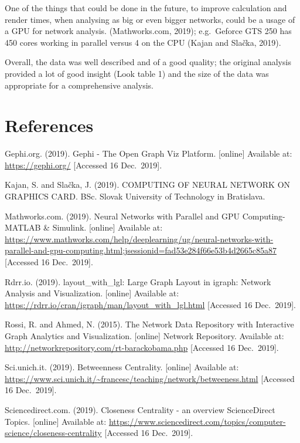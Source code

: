 \documentclass[
]{article}
\begin{document}
One of the things that could be done in the future, to improve
calculation and render times, when analysing as big or even bigger
networks, could be a usage of a GPU for network analysis.
(Mathworks.com, 2019); e.g.~Geforce GTS 250 has 450 cores working in
parallel versus 4 on the CPU (Kajan and Slačka, 2019).

Overall, the data was well described and of a good quality; the original
analysis provided a lot of good insight (Look table 1) and the size of
the data was appropriate for a comprehensive analysis.

\pagebreak

\hypertarget{references}{%
\section{References}\label{references}}

Gephi.org. (2019). Gephi - The Open Graph Viz Platform. {[}online{]}
Available at: \url{https://gephi.org/} {[}Accessed 16 Dec.~2019{]}.

Kajan, S. and Slačka, J. (2019). COMPUTING OF NEURAL NETWORK ON GRAPHICS
CARD. BSc. Slovak University of Technology in Bratislava.

Mathworks.com. (2019). Neural Networks with Parallel and GPU Computing-
MATLAB \& Simulink. {[}online{]} Available at:
\url{https://www.mathworks.com/help/deeplearning/ug/neural-networks-with-parallel-and-gpu-computing.html;jsessionid=fad53e284f66e53b4d2665c85a87}
{[}Accessed 16 Dec.~2019{]}.

Rdrr.io. (2019). layout\_with\_lgl: Large Graph Layout in igraph:
Network Analysis and Visualization. {[}online{]} Available at:
\url{https://rdrr.io/cran/igraph/man/layout_with_lgl.html} {[}Accessed
16 Dec.~2019{]}.

Rossi, R. and Ahmed, N. (2015). The Network Data Repository with
Interactive Graph Analytics and Visualization. {[}online{]} Network
Repository. Available at:
\url{http://networkrepository.com/rt-barackobama.php} {[}Accessed 16
Dec.~2019{]}.

Sci.unich.it. (2019). Betweenness Centrality. {[}online{]} Available at:
\url{https://www.sci.unich.it/~francesc/teaching/network/betweeness.html}
{[}Accessed 16 Dec.~2019{]}.

Sciencedirect.com. (2019). Closeness Centrality - an overview \textbar{}
ScienceDirect Topics. {[}online{]} Available at:
\url{https://www.sciencedirect.com/topics/computer-science/closeness-centrality}
{[}Accessed 16 Dec.~2019{]}.
\end{document}
